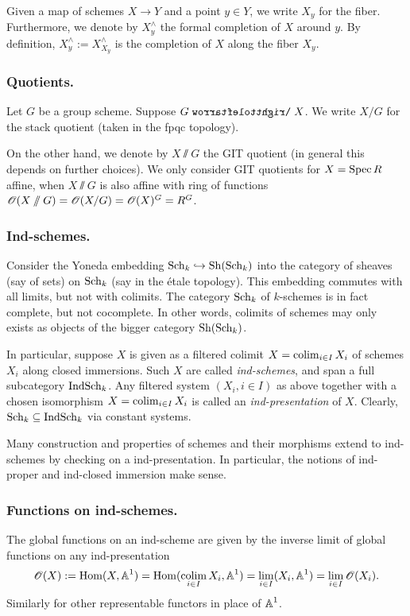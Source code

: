 Given a map of schemes $X \to Y$ and a point $y \in Y$, we write $X_y$ for the fiber. Furthermore, we denote by $X^{\wedge}_{y}$ the formal completion of $X$ around $y$. By definition, $X^{\wedge}_y := X^{\wedge}_{X_y}$ is the completion of $X$ along the fiber $X_y$.

\subsubsection{Quotients.}
Let $G$ be a group scheme. Suppose $G \acts X$. We write $X/G$ for the stack quotient (taken in the fpqc topology). 

On the other hand, we denote by $X \sslash G$ the GIT quotient (in general this depends on further choices). We only consider GIT quotients for $X = \operatorname{Spec} R$ affine, when $X\sslash G$ is also affine with ring of functions $\operatorname{\mathscr{O}}(X \sslash G) = \operatorname{\mathscr{O}}(X/G) = \operatorname{\mathscr{O}}(X)^G= R^G$.


\subsubsection{Ind-schemes.}
Consider the Yoneda embedding $\operatorname{Sch}_k \hookrightarrow \operatorname{Sh}(\operatorname{Sch}_k)$ into the category of sheaves (say of sets) on $\operatorname{Sch}_k$ (say in the étale topology). This embedding commutes with all limits, but not with colimits. The category $\operatorname{Sch}_k$ of $k$-schemes is in fact complete, but not cocomplete. In other words, colimits of schemes may only exists as objects of the bigger category $\operatorname{Sh}(\operatorname{Sch}_k)$. 

In particular, suppose $X$ is given as a filtered colimit $X = \operatorname*{colim}_{i \in I} X_i$ of schemes $X_i$ along closed immersions. Such $X$ are called \textit{ind-schemes}, and span a full subcategory $\operatorname{IndSch}_k$. Any filtered system $(X_i, i \in I)$ as above together with a chosen isomorphism $X = \operatorname*{colim}_{i \in I} X_i$ is called an \textit{ind-presentation} of $X$. Clearly, $\operatorname{Sch}_k \subseteq \operatorname{IndSch}_k$ via constant systems.


Many construction and properties of schemes and their morphisms extend to ind-schemes by checking on a ind-presentation. In particular, the notions of ind-proper and ind-closed immersion make sense. 

\subsubsection{Functions on ind-schemes.}
The global functions on an ind-scheme are given by the inverse limit of global functions on any ind-presentation
\begin{equation*}
    \operatorname{\mathscr{O}}(X) := \operatorname{Hom}(X, \operatorname{\mathbb{A}}^1) = \operatorname{Hom}(\operatorname*{colim}_{i\in I} X_i, \operatorname{\mathbb{A}}^1) = \operatorname*{lim}_{i \in I}(X_i, \operatorname{\mathbb{A}}^1) = \operatorname*{lim}_{i \in I} \operatorname{\mathscr{O}}(X_i).
\end{equation*}
Similarly for other representable functors in place of $\operatorname{\mathbb{A}}^1$.


